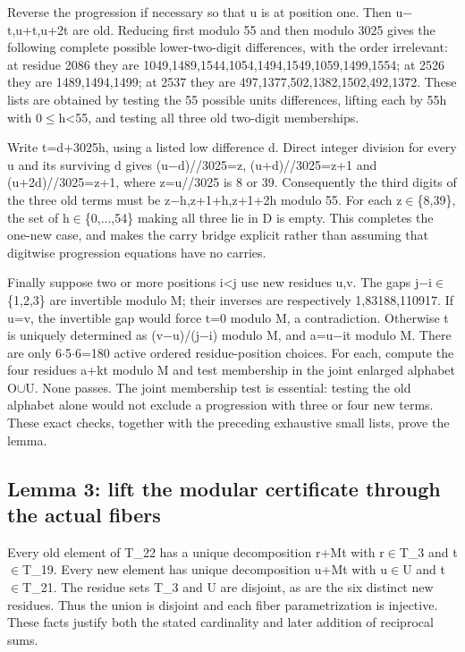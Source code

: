 \documentclass[11pt,a4paper]{article}
\begin{document}
Reverse the progression if necessary so that u is at position one. Then u\ensuremath{-}t,u+t,u+2t are old. Reducing first modulo 55 and then modulo 3025 gives the following complete possible lower-two-digit differences, with the order irrelevant: at residue 2086 they are 1049,1489,1544,1054,1494,1549,1059,1499,1554; at 2526 they are 1489,1494,1499; at 2537 they are 497,1377,502,1382,1502,492,1372. These lists are obtained by testing the 55 possible units differences, lifting each by 55h with 0\ensuremath{\leq}h<55, and testing all three old two-digit memberships.

Write t=d+3025h, using a listed low difference d. Direct integer division for every u and its surviving d gives (u\ensuremath{-}d)//3025=z, (u+d)//3025=z+1 and (u+2d)//3025=z+1, where z=u//3025 is 8 or 39. Consequently the third digits of the three old terms must be z\ensuremath{-}h,z+1+h,z+1+2h modulo 55. For each z\ensuremath{\in}\{8,39\}, the set of h\ensuremath{\in}\{0,...,54\} making all three lie in D is empty. This completes the one-new case, and makes the carry bridge explicit rather than assuming that digitwise progression equations have no carries.

Finally suppose two or more positions i<j use new residues u,v. The gaps j\ensuremath{-}i\ensuremath{\in}\{1,2,3\} are invertible modulo M; their inverses are respectively 1,83188,110917. If u=v, the invertible gap would force t=0 modulo M, a contradiction. Otherwise t is uniquely determined as (v\ensuremath{-}u)/(j\ensuremath{-}i) modulo M, and a=u\ensuremath{-}it modulo M. There are only 6\ensuremath{\cdot}5\ensuremath{\cdot}6=180 active ordered residue-position choices. For each, compute the four residues a+kt modulo M and test membership in the joint enlarged alphabet O\ensuremath{\cup}U. None passes. The joint membership test is essential: testing the old alphabet alone would not exclude a progression with three or four new terms. These exact checks, together with the preceding exhaustive small lists, prove the lemma.

\subsection{Lemma 3: lift the modular certificate through the actual fibers}
Every old element of T\_22 has a unique decomposition r+Mt with r\ensuremath{\in}T\_3 and t\ensuremath{\in}T\_19. Every new element has unique decomposition u+Mt with u\ensuremath{\in}U and t\ensuremath{\in}T\_21. The residue sets T\_3 and U are disjoint, as are the six distinct new residues. Thus the union is disjoint and each fiber parametrization is injective. These facts justify both the stated cardinality and later addition of reciprocal sums.
\end{document}
